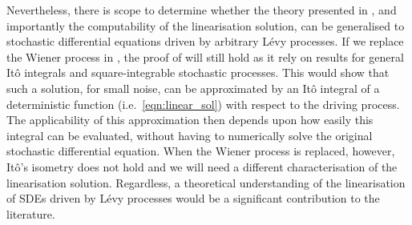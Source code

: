 Nevertheless, there is scope to determine whether the theory presented in , and importantly the computability of the linearisation solution, can be generalised to stochastic differential equations driven by arbitrary L\'evy processes.
If we replace the Wiener process in , the proof of  will still hold as it rely on results for general It\^o integrals and square-integrable stochastic processes.
This would show that such a solution, for small noise, can be approximated by an It\^o integral of a deterministic function (i.e.\ \cref{eqn:linear_sol}) with respect to the driving process.
The applicability of this approximation then depends upon how easily this integral can be evaluated, without having to numerically solve the original stochastic differential equation.
When the Wiener process is replaced, however, It\^o's isometry does not hold and we will need a different characterisation of the linearisation solution.
Regardless, a theoretical understanding of the linearisation of SDEs driven by L\'evy processes would be a significant contribution to the literature.



